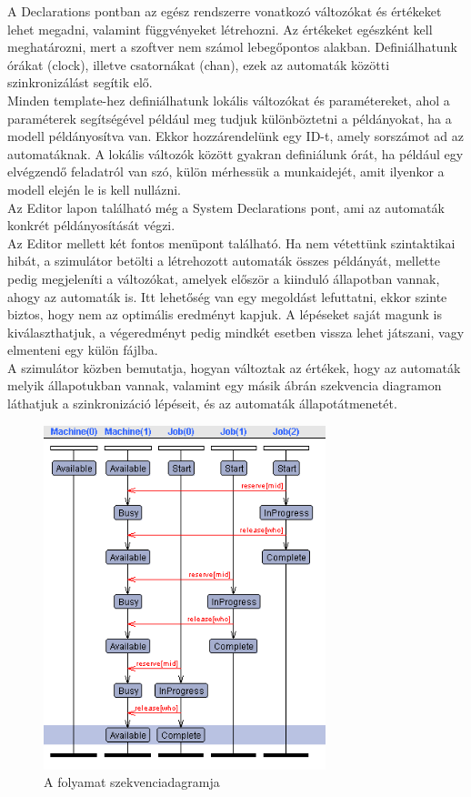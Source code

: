 \documentclass [12pt]{report}
\begin{document}
A  Declarations pontban az egész rendszerre vonatkozó változókat és értékeket lehet megadni, valamint függvényeket létrehozni. Az értékeket egészként kell meghatározni, mert a szoftver nem számol lebegőpontos alakban. Definiálhatunk órákat (clock), illetve csatornákat (chan), ezek az automaták közötti szinkronizálást segítik elő.\\
Minden template-hez definiálhatunk lokális változókat és paramétereket, ahol a paraméterek segítségével például meg tudjuk különböztetni a példányokat, ha a modell példányosítva van. Ekkor hozzárendelünk egy ID-t, amely sorszámot ad az automatáknak. A lokális változók között gyakran definiálunk órát, ha például egy elvégzendő feladatról van szó, külön mérhessük a munkaidejét, amit ilyenkor a modell elején le is kell nullázni.\\ 
Az Editor lapon található még a System Declarations pont, ami az automaták konkrét példányosítását végzi.\\
Az Editor mellett két fontos menüpont található. Ha nem vétettünk szintaktikai hibát, a szimulátor betölti a létrehozott automaták összes példányát, mellette pedig megjeleníti a változókat, amelyek először a kiinduló állapotban vannak, ahogy az automaták is. Itt lehetőség van egy megoldást lefuttatni, ekkor szinte biztos, hogy nem az optimális eredményt kapjuk. A lépéseket saját magunk is kiválaszthatjuk, a végeredményt pedig mindkét esetben vissza lehet játszani, vagy elmenteni egy külön fájlba.  \\
A szimulátor közben bemutatja, hogyan változtak az értékek, hogy az automaták melyik állapotukban vannak, valamint egy másik ábrán szekvencia diagramon láthatjuk a szinkronizáció lépéseit, és az automaták állapotátmenetét.\\
\begin{figure}[htpb]
\begin{center}
\includegraphics[height=10cm]{szekvencia}
\caption{A folyamat szekvenciadagramja}
\end{center}
\end{figure}
\end{document}
